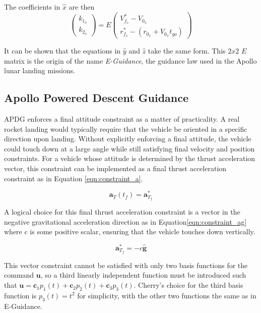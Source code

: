 The coefficients in $\hat{x}$ are then
\begin{equation}
\label{eqn:simplelaw}
\begin{pmatrix}
k_{1_x} \\
k_{2_x}
\end{pmatrix}
= E
\begin{pmatrix}
V_{f_x}^* - V_{0_x} \\ 
r_{f_x}^* - (r_{0_x} + V_{0_x}t_{go}) 
\end{pmatrix}
\end{equation}

It can be shown that the equations in $\hat{y}$ and $\hat{z}$ take the same form. This $2x2$ $E$ matrix is the origin of the name \textit{E-Guidance}, the guidance law used in the Apollo lunar landing missions.

\subsection{Apollo Powered Descent Guidance} \label{sec:APDG}

APDG enforces a final attitude constraint as a matter of practicality. A real rocket landing would typically require that the vehicle be oriented in a specific direction upon landing. Without explicitly enforcing a final attitude, the vehicle could touch down at a large angle while still satisfying final velocity and position constraints. For a vehicle whose attitude is determined by the thrust acceleration vector, this constraint can be implemented as a final thrust acceleration constraint as in Equation \ref{eqn:constraint_a}.

\begin{equation}
\label{eqn:constraint_a}
\bm{a}_T(t_f) = \bm{a}^*_{T_f}
\end{equation}

A logical choice for this final thrust acceleration constraint is a vector in the negative gravitational acceleration direction as in Equation\:\ref{eqn:constraint_ag} where c is some positive scalar, ensuring that the vehicle touches down vertically. 

\begin{equation}
\label{eqn:constraint_ag}
\bm{a}^*_{T_f} = -c\bm{\hat{g}}
\end{equation}

This vector constraint cannot be satisfied with only two basis functions for the command $\bm{u}$, so a third linearly independent function must be introduced such that $\bm{u} = \bm{c}_1 p_1(t) +\bm{c}_2 p_2(t) + \bm{c}_3 p_3(t)$. Cherry's choice for the third basis function is $p_3(t) = t^2$ for simplicity, with the other two functions the same as in E-Guidance.

